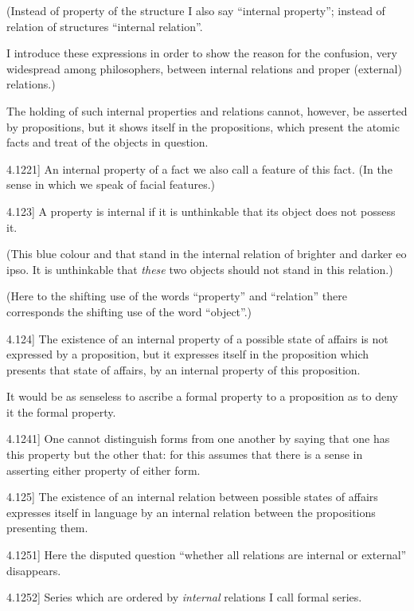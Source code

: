 \documentclass[12pt,oneside]{book}[2007/10/19]
\newcommand{\PropositionE}[2]{%
  \item[\phantomsection\label{PropE:#1}\PropGRef{#1}] #2%
}
\newcommand{\PropGRef}[1]{\hyperref[PropG:#1]{#1}}
\begin{document}
\begin{propositions}
{(Instead of property of the structure I also say
``internal property''; instead of relation of structures
``internal relation''.

I introduce these expressions in order to show
the reason for the confusion, very widespread
among philosophers, between internal relations
and proper (external) relations.)

The holding of such internal properties and relations
cannot, however, be asserted by propositions,
but it shows itself in the propositions, which
present the atomic facts and treat of the objects in
question.}


\PropositionE{4.1221}
{An internal property of a fact we also call a
feature of this fact. (In the sense in which we
speak of facial features.)}


\PropositionE{4.123}
{A property is internal if it is unthinkable that
its object does not possess it.

(This blue colour and that stand in the internal
relation of brighter and darker eo ipso. It is
unthinkable that \emph{these} two objects should not stand
in this relation.)

(Here to the shifting use of the words ``property''
and ``relation'' there corresponds the shifting use
of the word ``object''.)}


\PropositionE{4.124}
{The existence of an internal property of a possible
state of affairs is not expressed by a proposition,
but it expresses itself in the proposition which
presents that state of affairs, by an internal property
of this proposition.

It would be as senseless to ascribe a formal
property to a proposition as to deny it the formal
property.}


\PropositionE{4.1241}
{One cannot distinguish forms from one another
by saying that one has this property but the other
that: for this assumes that there is a sense in asserting
either property of either form.}


\PropositionE{4.125}
{The existence of an internal relation between
possible states of affairs expresses itself in language
by an internal relation between the propositions
presenting them.}


\PropositionE{4.1251}
{Here the disputed question ``whether all relations
are internal or external'' disappears.}


\PropositionE{4.1252}
{Series which are ordered by \emph{internal} relations I
call formal series.

}
\end{propositions}
\end{document}
